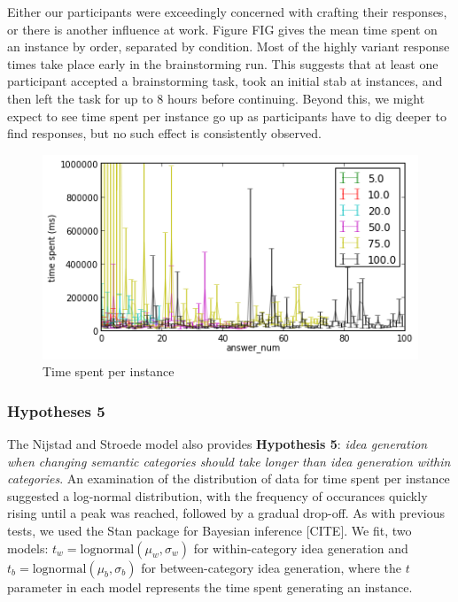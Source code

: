 Either our participants were exceedingly concerned with crafting their responses, or there is another influence at work. Figure FIG gives the mean time spent on an instance by order, separated by condition. Most of the highly variant response times take place early in the brainstorming run. This suggests that at least one participant accepted a brainstorming task, took an initial stab at instances, and then left the task for up to 8 hours before continuing. Beyond this, we might expect to see time spent per instance go up as participants have to dig deeper to find responses, but no such effect is consistently observed.

\begin{figure}[h]
    \centering
    \includegraphics[width=0.9\columnwidth]{time_spent_order}
    \caption{Time spent per instance}
\end{figure}

\subsubsection{Hypotheses 5}

The Nijstad and Stroede \cite{nijstad_how_2006} model also provides \textbf{Hypothesis 5}: \emph{idea generation when changing semantic categories should take longer than idea generation within categories}. An examination of the distribution of data for time spent per instance suggested a log-normal distribution, with the frequency of occurances quickly rising until a peak was reached, followed by a gradual drop-off. As with previous tests, we used the Stan package for Bayesian inference [CITE]. We fit, two models: $t_w = \text{lognormal}(\mu_w, \sigma_w)$ for within-category idea generation and $t_b = \text{lognormal}(\mu_b, \sigma_b)$ for between-category idea generation, where the $t$ parameter in each model represents the time spent generating an instance.

